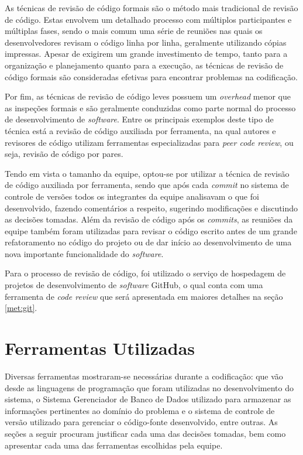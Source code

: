 As técnicas de revisão de código formais são o método mais tradicional de revisão de código.
Estas envolvem um detalhado processo com múltiplos participantes e múltiplas fases, sendo o mais comum uma série de reuniões nas quais os desenvolvedores revisam o código linha por linha, geralmente utilizando cópias impressas.
Apesar de exigirem um grande investimento de tempo, tanto para a organização e planejamento quanto para a execução, as técnicas de revisão de código formais são consideradas efetivas para encontrar problemas na codificação.

Por fim, as técnicas de revisão de código leves possuem um \emph{overhead} menor que as inspeções formais e são geralmente conduzidas como parte normal do processo de desenvolvimento de \emph{software}.
Entre os principais exemplos deste tipo de técnica está a revisão de código auxiliada por ferramenta, na qual autores e revisores de código utilizam ferramentas especializadas para \emph{peer code review}, ou seja, revisão de código por pares.

Tendo em vista o tamanho da equipe, optou-se por utilizar a técnica de revisão de código auxiliada por ferramenta, sendo que após cada \emph{commit} no sistema de controle de versões todos os integrantes da equipe analisavam o que foi desenvolvido, fazendo comentários a respeito, sugerindo modificações e discutindo as decisões tomadas.
Além da revisão de código após os \emph{commits}, as reuniões da equipe também foram utilizadas para revisar o código escrito antes de um grande refatoramento no código do projeto ou de dar início ao desenvolvimento de uma nova importante funcionalidade do \emph{software}.

Para o processo de revisão de código, foi utilizado o serviço de hospedagem de projetos de desenvolvimento de \emph{software} GitHub, o qual conta com uma ferramenta de \emph{code review} que será apresentada em maiores detalhes na seção \ref{met:git}.


\section{Ferramentas Utilizadas}

Diversas ferramentas mostraram-se necessárias durante a codificação: que vão desde as linguagens de programação que foram utilizadas no desenvolvimento do sistema, o Sistema Gerenciador de Banco de Dados utilizado para armazenar as informações pertinentes ao domínio do problema e o sistema de controle de versão utilizado para gerenciar o código-fonte desenvolvido, entre outras.
As seções a seguir procuram justificar cada uma das decisões tomadas, bem como apresentar cada uma das ferramentas escolhidas pela equipe.

